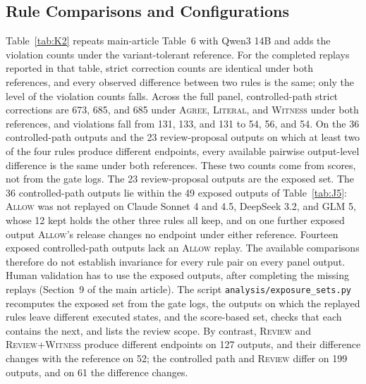 \documentclass[acmsmall,review]{acmart}
\newcommand{\agree}{\textsc{Agree}}
\newcommand{\allow}{\textsc{Allow}}
\newcommand{\literal}{\textsc{Literal}}
\newcommand{\witness}{\textsc{Witness}}
\newcommand{\review}{\textsc{Review}}
\begin{document}
\subsection{Rule Comparisons and Configurations}
Table~\ref{tab:K2} repeats main-article Table~6 with Qwen3 14B and adds the violation counts under the variant-tolerant reference. For the completed replays reported in that table, strict correction counts are identical under both references, and every observed difference between two rules is the same; only the level of the violation counts falls. Across the full panel, controlled-path strict corrections are 673, 685, and 685 under \agree{}, \literal{}, and \witness{} under both references, and violations fall from 131, 133, and 131 to 54, 56, and 54. On the 36 controlled-path outputs and the 23 review-proposal outputs on which at least two of the four rules produce different endpoints, every available pairwise output-level difference is the same under both references. These two counts come from scores, not from the gate logs. The 23 review-proposal outputs are the exposed set. The 36 controlled-path outputs lie within the 49 exposed outputs of Table~\ref{tab:J5}: \allow{} was not replayed on Claude Sonnet 4 and 4.5, DeepSeek 3.2, and GLM 5, whose 12 kept holds the other three rules all keep, and on one further exposed output \allow{}'s release changes no endpoint under either reference. Fourteen exposed controlled-path outputs lack an \allow{} replay. The available comparisons therefore do not establish invariance for every rule pair on every panel output. Human validation has to use the exposed outputs, after completing the missing replays (Section~9 of the main article). The script \texttt{analysis/exposure\_sets.py} recomputes the exposed set from the gate logs, the outputs on which the replayed rules leave different executed states, and the score-based set, checks that each contains the next, and lists the review scope. By contrast, \review{} and \review{}+\witness{} produce different endpoints on 127 outputs, and their difference changes with the reference on 52; the controlled path and \review{} differ on 199 outputs, and on 61 the difference changes.
\end{document}
